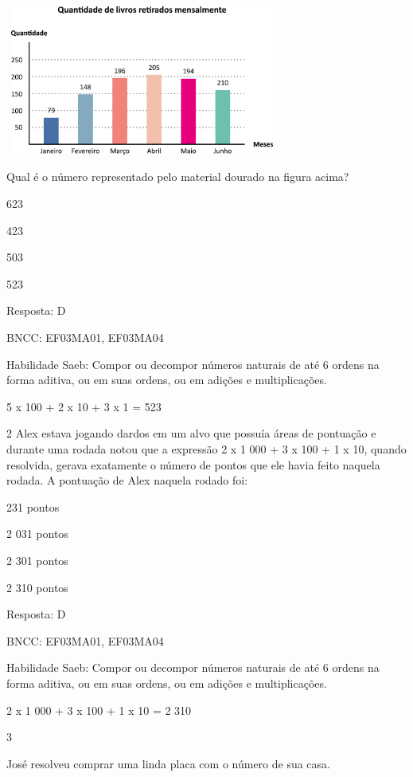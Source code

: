 \begin{escolha}
{\begin{escolha}
{\includegraphics[width=3.55128in,height=1.93600in]{media/image106.png}

Qual é o número representado pelo material dourado na figura acima?

\begin{escolha}
\item
  623
\item
  423
\item
  503
\item
  523
\end{escolha}

Resposta: D

BNCC: EF03MA01, EF03MA04

Habilidade Saeb: Compor ou decompor números naturais de até 6 ordens na
forma aditiva, ou em suas ordens, ou em adições e multiplicações.

5 x 100 + 2 x 10 + 3 x 1 = 523

\num{2} Alex estava jogando dardos em um alvo que possuía áreas de pontuação e
durante uma rodada notou que a expressão 2 x 1 000 + 3 x 100 + 1 x 10,
quando resolvida, gerava exatamente o número de pontos que ele havia
feito naquela rodada. A pontuação de Alex naquela rodado foi:

\begin{escolha}
\item
  231 pontos
\item
  2 031 pontos
\item
  2 301 pontos
\item
  2 310 pontos
\end{escolha}

Resposta: D

BNCC: EF03MA01, EF03MA04

Habilidade Saeb: Compor ou decompor números naturais de até 6 ordens na
forma aditiva, ou em suas ordens, ou em adições e multiplicações.

2 x 1 000 + 3 x 100 + 1 x 10 = 2 310

\num{3}

José resolveu comprar uma linda placa com o número de sua casa.

}
\end{escolha}}
\end{escolha}
